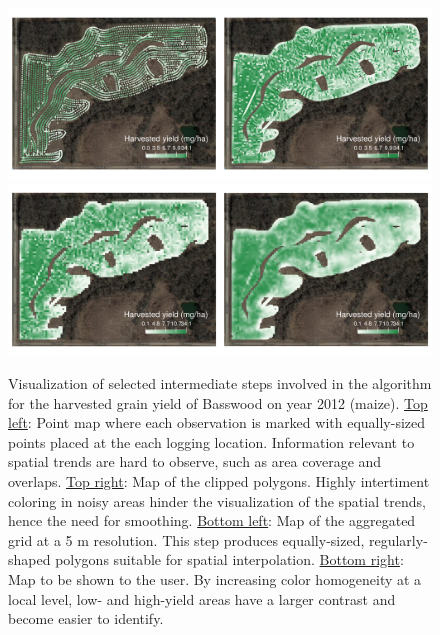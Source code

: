 \documentclass[12pt]{article}
\begin{document}
\begin{figure}[ht]  \centering
  \includegraphics[width=\textwidth]{basswood_2012_res5_points_vehicle}
  \includegraphics[width=\textwidth]{basswood_2012_res5_1_agg_smoothed}
  \caption[Visualization of selected algorithm steps as applied to a
  specific dataset]{Visualization of selected intermediate steps
    involved in the algorithm for the harvested grain yield of
    Basswood on year 2012 (maize). \underline{Top left}: Point map
    where each observation is marked with equally-sized points placed
    at the each logging location. Information relevant to spatial
    trends are hard to observe, such as area coverage and
    overlaps. \underline{Top right}: Map of the clipped
    polygons. Highly intertiment coloring in noisy areas hinder the
    visualization of the spatial trends, hence the need for
    smoothing. \underline{Bottom left}: Map of the aggregated grid at
    a 5 m resolution. This step produces equally-sized,
    regularly-shaped polygons suitable for spatial
    interpolation. \underline{Bottom right}: Map to be shown to the
    user. By increasing color homogeneity at a local level, low- and
    high-yield areas have a larger contrast and become easier to
    identify.}
  \label{fig:basswood2012-main-steps}
\end{figure}
\end{document}
